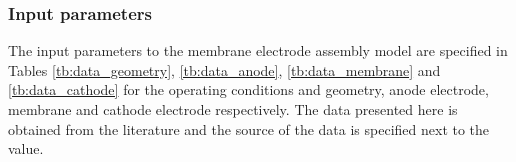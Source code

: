 \documentclass[]{elsart}
\renewcommand{\vec}[1]{\mathbf{#1}}
\begin{document}


\subsubsection{Input parameters} \label{sec:input_parameters}

The input parameters to the membrane electrode assembly model are specified in Tables \ref{tb:data_geometry}, \ref{tb:data_anode}, \ref{tb:data_membrane} and \ref{tb:data_cathode} for the operating conditions and geometry, anode electrode, membrane and cathode electrode respectively. The data presented here is obtained from the literature and the source of the data is specified next to the value. 
\end{document}
